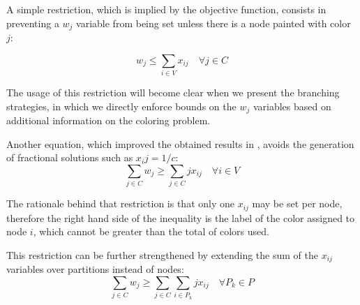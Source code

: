 A simple restriction, which is implied by the objective function, consists in preventing a $w_j$ variable from being set unless there is a node painted with color $j$:

\begin{equation}
\label{eqn:wjleqsumcolor}
w_j \leq \sum_{i \in V} x_{ij} \quad \forall j \in C
\end{equation}

The usage of this restriction will become clear when we present the branching strategies, in which we directly enforce bounds on the $w_j$ variables based on additional information on the coloring problem.

Another equation, which improved the obtained results in \cite{mendez2006branch}, avoids the generation of fractional solutions such as $x_ij = 1/c$:
\begin{equation}
\label{eqn:wjgeqsumnode}
\sum_{j \in C} w_j \geq \sum_{j \in C} j x_{ij} \quad \forall i \in V
\end{equation}

The rationale behind that restriction is that only one $x_{ij}$ may be set per node, therefore the right hand side of the inequality is the label of the color assigned to node $i$, which cannot be greater than the total of colors used.

This restriction can be further strengthened by extending the sum of the $x_{ij}$ variables over partitions instead of nodes:
\begin{equation}
\label{eqn:wjgeqsumpart}
\sum_{j \in C} w_j \geq \sum_{j \in C} \sum_{i \in P_k} j x_{ij} \quad \forall P_k \in P
\end{equation}